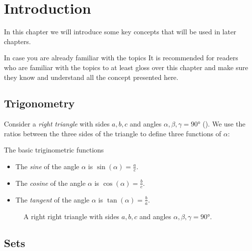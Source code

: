 \chapter{Introduction}
In this chapter we will introduce some key concepts that will be used in later chapters.

\begin{note}{In case you are already familiar with the topics}{}
	It is recommended for readers who are familiar with the topics to at least gloss over this chapter and make sure they know and understand all the concept presented here.
\end{note}

\section{Trigonometry}
Consider a \emph{right triangle} with sides $a,b,c$ and angles $\alpha, \beta, \gamma=\ang{90}$ (). We use the ratios between the three sides of the triangle to define three functions of $\alpha$:
\begin{definition}{The basic triginometric functions}{}

	\vspace{5mm}
	\begin{itemize}
		\item The \emph{sine} of the angle $\alpha$ is $\sin(\alpha)=\frac{a}{c}$.
		\item The \emph{cosine} of the angle $\alpha$ is $\cos(\alpha)=\frac{b}{c}$.
		\item The \emph{tangent} of the angle $\alpha$ is $\tan(\alpha)=\frac{b}{a}$.
		\end{itemize}
	\label{def:basic_trig}

\begin{figure}[H]
	\centering
	\caption{A right right triangle with sides $a,b,c$ and angles $\alpha,\beta,\gamma=\ang{90}$.}
	\label{fig:righttriangle}
\end{figure}
\end{definition}
\section{Sets}
